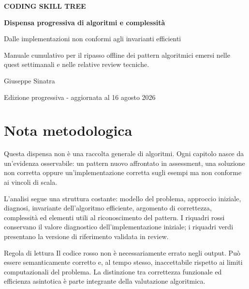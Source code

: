 \documentclass[11pt,a4paper,openany]{book}
\begin{document}
\frontmatter
\begin{titlepage}
  \centering
  \vspace*{2.2cm}
  {\Large\color{Accent}\bfseries CODING SKILL TREE\par}
  \vspace{1.5cm}
  {\Huge\color{Ink}\bfseries Dispensa progressiva di algoritmi e complessità\par}
  \vspace{0.7cm}
  {\Large\color{Slate}Dalle implementazioni non conformi agli invarianti efficienti\par}
  \vfill
  \begin{tcolorbox}[
    width=0.82\textwidth,
    colback=Paper,
    colframe=Accent,
    boxrule=0.8pt,
    arc=2pt
  ]
  \centering
  Manuale cumulativo per il ripasso offline dei pattern algoritmici emersi
  nelle quest settimanali e nelle relative review tecniche.
  \end{tcolorbox}
  \vfill
  {\large Giuseppe Sinatra\par}
  \vspace{0.3cm}
  {\color{Slate}Edizione progressiva - aggiornata al 16 agosto 2026\par}
\end{titlepage}

\chapter*{Nota metodologica}

Questa dispensa non è una raccolta generale di algoritmi. Ogni capitolo nasce
da un'evidenza osservabile: un pattern nuovo affrontato in assessment, una
soluzione non corretta oppure un'implementazione corretta sugli esempi ma non
conforme ai vincoli di scala.

L'analisi segue una struttura costante: modello del problema, approccio
iniziale, diagnosi, invariante dell'algoritmo efficiente, argomento di
correttezza, complessità ed elementi utili al riconoscimento del pattern.
I riquadri rossi conservano il valore diagnostico dell'implementazione
iniziale; i riquadri verdi presentano la versione di riferimento validata in
review.

\begin{principlebox}{Regola di lettura}
Il codice rosso non è necessariamente errato negli output. Può essere
semanticamente corretto e, al tempo stesso, inaccettabile rispetto ai limiti
computazionali del problema. La distinzione tra correttezza funzionale ed
efficienza asintotica è parte integrante della valutazione algoritmica.
\end{principlebox}
\end{document}
